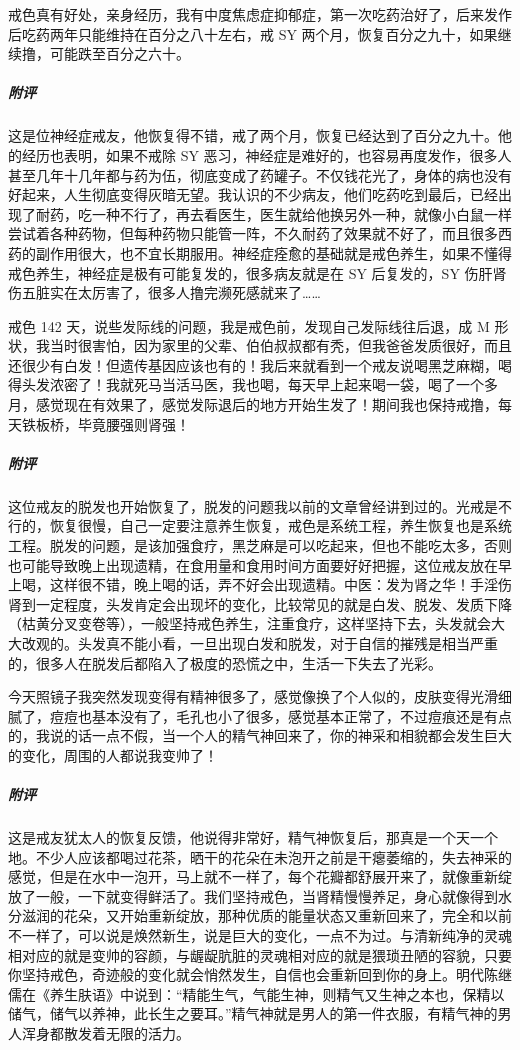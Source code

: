 \begin{case}
    戒色真有好处，亲身经历，我有中度焦虑症抑郁症，第一次吃药治好了，后来发作后吃药两年只能维持在百分之八十左右，戒 SY 两个月，恢复百分之九十，如果继续撸，可能跌至百分之六十。
    \subparagraph{附评} 这是位神经症戒友，他恢复得不错，戒了两个月，恢复已经达到了百分之九十。他的经历也表明，如果不戒除 SY 恶习，神经症是难好的，也容易再度发作，很多人甚至几年十几年都与药为伍，彻底变成了药罐子。不仅钱花光了，身体的病也没有好起来，人生彻底变得灰暗无望。我认识的不少病友，他们吃药吃到最后，已经出现了耐药，吃一种不行了，再去看医生，医生就给他换另外一种，就像小白鼠一样尝试着各种药物，但每种药物只能管一阵，不久耐药了效果就不好了，而且很多西药的副作用很大，也不宜长期服用。神经症痊愈的基础就是戒色养生，如果不懂得戒色养生，神经症是极有可能复发的，很多病友就是在 SY 后复发的，SY 伤肝肾伤五脏实在太厉害了，很多人撸完濒死感就来了……
\end{case}

\begin{case}
    戒色 142 天，说些发际线的问题，我是戒色前，发现自己发际线往后退，成 M 形状，我当时很害怕，因为家里的父辈、伯伯叔叔都有秃，但我爸爸发质很好，而且还很少有白发！但遗传基因应该也有的！我后来就看到一个戒友说喝黑芝麻糊，喝得头发浓密了！我就死马当活马医，我也喝，每天早上起来喝一袋，喝了一个多月，感觉现在有效果了，感觉发际退后的地方开始生发了！期间我也保持戒撸，每天铁板桥，毕竟腰强则肾强！
    \subparagraph{附评} 这位戒友的脱发也开始恢复了，脱发的问题我以前的文章曾经讲到过的。光戒是不行的，恢复很慢，自己一定要注意养生恢复，戒色是系统工程，养生恢复也是系统工程。脱发的问题，是该加强食疗，黑芝麻是可以吃起来，但也不能吃太多，否则也可能导致晚上出现遗精，在食用量和食用时间方面要好好把握，这位戒友放在早上喝，这样很不错，晚上喝的话，弄不好会出现遗精。中医：发为肾之华！手淫伤肾到一定程度，头发肯定会出现坏的变化，比较常见的就是白发、脱发、发质下降（枯黄分叉变卷等），一般坚持戒色养生，注重食疗，这样坚持下去，头发就会大大改观的。头发真不能小看，一旦出现白发和脱发，对于自信的摧残是相当严重的，很多人在脱发后都陷入了极度的恐慌之中，生活一下失去了光彩。
\end{case}

\begin{case}
    今天照镜子我突然发现变得有精神很多了，感觉像换了个人似的，皮肤变得光滑细腻了，痘痘也基本没有了，毛孔也小了很多，感觉基本正常了，不过痘痕还是有点的，我说的话一点不假，当一个人的精气神回来了，你的神采和相貌都会发生巨大的变化，周围的人都说我变帅了！
    \subparagraph{附评} 这是戒友犹太人的恢复反馈，他说得非常好，精气神恢复后，那真是一个天一个地。不少人应该都喝过花茶，晒干的花朵在未泡开之前是干瘪萎缩的，失去神采的感觉，但是在水中一泡开，马上就不一样了，每个花瓣都舒展开来了，就像重新绽放了一般，一下就变得鲜活了。我们坚持戒色，当肾精慢慢养足，身心就像得到水分滋润的花朵，又开始重新绽放，那种优质的能量状态又重新回来了，完全和以前不一样了，可以说是焕然新生，说是巨大的变化，一点不为过。与清新纯净的灵魂相对应的就是变帅的容颜，与龌龊肮脏的灵魂相对应的就是猥琐丑陋的容貌，只要你坚持戒色，奇迹般的变化就会悄然发生，自信也会重新回到你的身上。明代陈继儒在《养生肤语》中说到：“精能生气，气能生神，则精气又生神之本也，保精以储气，储气以养神，此长生之要耳。”精气神就是男人的第一件衣服，有精气神的男人浑身都散发着无限的活力。
\end{case}

